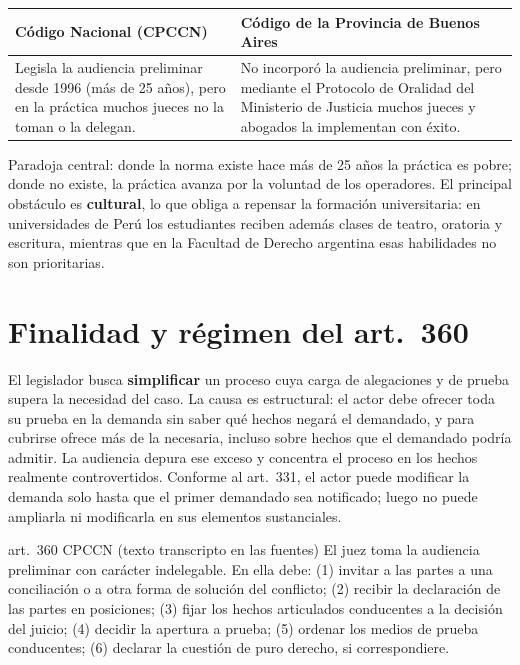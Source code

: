 \documentclass[12pt,oneside]{book}
\renewcommand{\arraystretch}{1.15}
\begin{document}
\begin{table}[H]
\centering
\renewcommand{\arraystretch}{1.25}
\begin{tabularx}{\textwidth}{>{\RaggedRight\arraybackslash}X>{\RaggedRight\arraybackslash}X}
\toprule
\textbf{Código Nacional (CPCCN)} & \textbf{Código de la Provincia de Buenos Aires} \\
\midrule
Legisla la audiencia preliminar desde 1996 (más de 25 años), pero en la práctica muchos jueces no la toman o la delegan. & No incorporó la audiencia preliminar, pero mediante el Protocolo de Oralidad del Ministerio de Justicia muchos jueces y abogados la implementan con éxito. \\
\bottomrule
\end{tabularx}
\end{table}

\begin{importante}
Paradoja central: donde la norma existe hace más de 25 años la práctica es pobre; donde no existe, la práctica avanza por la voluntad de los operadores. El principal obstáculo es \textbf{cultural}, lo que obliga a repensar la formación universitaria: en universidades de Perú los estudiantes reciben además clases de teatro, oratoria y escritura, mientras que en la Facultad de Derecho argentina esas habilidades no son prioritarias.
\end{importante}

\section{Finalidad y régimen del art.~360}

El legislador busca \textbf{simplificar} un proceso cuya carga de alegaciones y de prueba supera la necesidad del caso. La causa es estructural: el actor debe ofrecer toda su prueba en la demanda sin saber qué hechos negará el demandado, y para cubrirse ofrece más de la necesaria, incluso sobre hechos que el demandado podría admitir. La audiencia depura ese exceso y concentra el proceso en los hechos realmente controvertidos. Conforme al art.~331, el actor puede modificar la demanda solo hasta que el primer demandado sea notificado; luego no puede ampliarla ni modificarla en sus elementos sustanciales.

\begin{regla}{art.~360 CPCCN (texto transcripto en las fuentes)}
El juez toma la audiencia preliminar con carácter indelegable. En ella debe: (1) invitar a las partes a una conciliación o a otra forma de solución del conflicto; (2) recibir la declaración de las partes en posiciones; (3) fijar los hechos articulados conducentes a la decisión del juicio; (4) decidir la apertura a prueba; (5) ordenar los medios de prueba conducentes; (6) declarar la cuestión de puro derecho, si correspondiere.
\end{regla}
\end{document}
